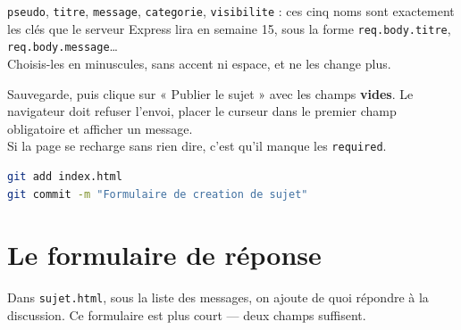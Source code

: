 \documentclass[a4paper,11pt]{article}
\begin{document}
\begin{tcolorbox}[attention, title={Les \texttt{name} de ce formulaire sont définitifs}]
\texttt{pseudo}, \texttt{titre}, \texttt{message}, \texttt{categorie}, \texttt{visibilite} : ces cinq noms sont exactement les clés que le serveur Express lira en semaine 15, sous la forme \texttt{req.body.titre}, \texttt{req.body.message}\dots\\[4pt]
Choisis-les en minuscules, sans accent ni espace, et ne les change plus.
\end{tcolorbox}

\begin{tcolorbox}[astuce, title={Le premier test à faire}]
Sauvegarde, puis clique sur « Publier le sujet » avec les champs \textbf{vides}. Le navigateur doit refuser l'envoi, placer le curseur dans le premier champ obligatoire et afficher un message.\\[4pt]
Si la page se recharge sans rien dire, c'est qu'il manque les \texttt{required}.
\end{tcolorbox}

\begin{tcolorbox}[astuce, title={Point d'étape}]
\begin{lstlisting}[language=bash, numbers=none]
git add index.html
git commit -m "Formulaire de creation de sujet"
\end{lstlisting}
\end{tcolorbox}

\newpage

\section{Le formulaire de réponse}

Dans \texttt{sujet.html}, sous la liste des messages, on ajoute de quoi répondre à la discussion. Ce formulaire est plus court --- deux champs suffisent.
\end{document}
